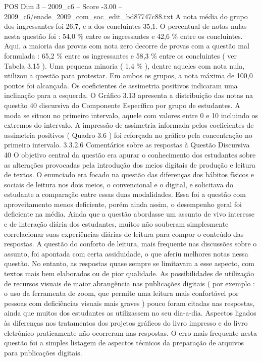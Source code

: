 \begin{textsample}{POS Dim 3 – 2009\_c6 – Score -3.00 – 2009\_c6/enade\_2009\_com\_soc\_edit\_bd87747c88.txt}
A nota média do grupo dos ingressantes foi 26,7, e a dos concluintes 35,1.
O percentual de notas nulas nesta questão foi : 54,0 \% entre os ingressantes e 42,6 \% entre os concluintes.
Aqui, a maioria das provas com nota zero decorre de provas com a questão mal formulada : 65,2 \% entre os ingressantes e 58,3 \% entre os concluintes ( ver Tabela 3.15 ).
Uma pequena minoria ( 1,4 \% ), dentre aqueles com nota nula, utilizou a questão para protestar.
Em ambos os grupos, a nota máxima de 100,0 pontos foi alcançada.
Os coeficientes de assimetria positivos indicaram uma inclinação para a esquerda.
O Gráfico 3.13 apresenta a distribuição das notas na questão 40 discursiva do Componente Específico por grupo de estudantes.
A moda se situou no primeiro intervalo, aquele com valores entre 0 e 10 incluindo os extremos do intervalo.
A impressão de assimetria informada pelos coeficientes de assimetria positivos ( Quadro 3.6 ) foi reforçada no gráfico pela concentração no primeiro intervalo. 3.3.2.6 Comentários sobre as respostas à Questão Discursiva 40 O objetivo central da questão era apurar o conhecimento dos estudantes sobre as alterações provocadas pela introdução dos meios digitais de produção e leitura de textos.
O enunciado era focado na questão das diferenças dos hábitos físicos e sociais de leitura nos dois meios, o convencional e o digital, e solicitava do estudante a comparação entre essas duas modalidades.
Essa foi a questão com aproveitamento menos deficiente, porém ainda assim, o desempenho geral foi deficiente na média.
Ainda que a questão abordasse um assunto de vivo interesse e de interação diária dos estudantes, muitos não souberam simplesmente correlacionar suas experiências diárias de leitura para compor o conteúdo das respostas.
A questão do conforto de leitura, mais frequente nas discussões sobre o assunto, foi apontada com certa assiduidade, o que aferiu melhores notas nessa questão.
No entanto, as respostas quase sempre se limitavam a esse aspecto, com textos mais bem elaborados ou de pior qualidade.
As possibilidades de utilização de recursos visuais de maior abrangência nas publicações digitais ( por exemplo : o uso da ferramenta de zoom, que permite uma leitura mais confortável por pessoas com deficiências visuais mais graves ) pouco foram citadas nas respostas, ainda que muitos dos estudantes as utilizassem no seu dia-a-dia.
Aspectos ligados às diferenças nos tratamentos dos projetos gráficos do livro impresso e do livro eletrônico praticamente não ocorreram nas respostas.
O erro mais frequente nesta questão foi a simples listagem de aspectos técnicos da preparação de arquivos para publicações digitais.

\end{textsample}
